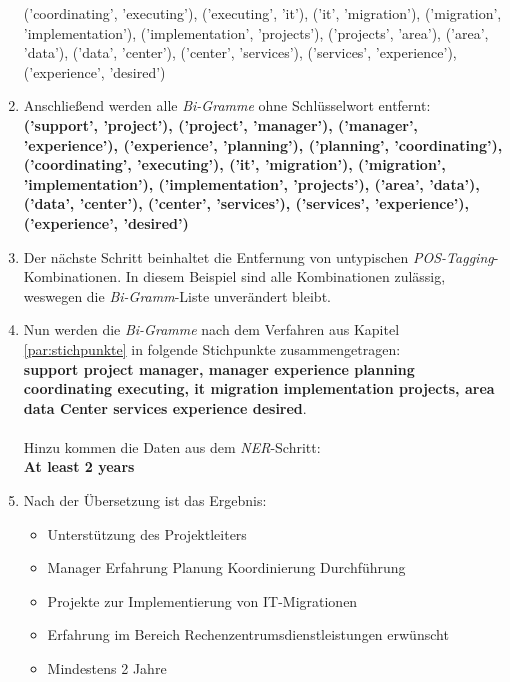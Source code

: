 \begin{enumerate}
{	('coordinating', 'executing'), ('executing', 'it'), ('it', 'migration'), ('migration', 'implementation'), ('implementation', 'projects'), ('projects', 'area'), ('area', 'data'), ('data', 'center'), ('center', 'services'), ('services', 'experience'), ('experience', 'desired')}
	\item Anschließend werden alle \emph{Bi-Gramme} ohne Schlüsselwort entfernt:\\ \textbf{('support', 'project'), ('project', 'manager'), ('manager', 'experience'), ('experience', 'planning'), ('planning', 'coordinating'), ('coordinating', 'executing'), ('it', 'migration'), ('migration', 'implementation'), ('implementation', 'projects'), ('area', 'data'), ('data', 'center'), ('center', 'services'), ('services', 'experience'), ('experience', 'desired')}
	\item Der nächste Schritt beinhaltet die Entfernung von untypischen \emph{POS-Tagging}-Kombinationen. In diesem Beispiel sind alle Kombinationen zulässig, weswegen die \emph{Bi-Gramm}-Liste unverändert bleibt.
	\item Nun werden die \emph{Bi-Gramme} nach dem Verfahren aus Kapitel \ref{par:stichpunkte} in folgende Stichpunkte zusammengetragen:\\ \textbf{support project manager, manager experience planning coordinating executing, it migration implementation projects, area data Center services experience desired}.\\ \\ Hinzu kommen die Daten aus dem \emph{NER}-Schritt:\\ \textbf{At least 2 years}
	\item Nach der Übersetzung ist das Ergebnis: \begin{itemize}\itemsep-0.3em\item Unterstützung des Projektleiters \item Manager Erfahrung Planung Koordinierung Durchführung \item Projekte zur Implementierung von IT-Migrationen \item Erfahrung im Bereich Rechenzentrumsdienstleistungen erwünscht \item Mindestens 2 Jahre \end{itemize}
\end{enumerate}